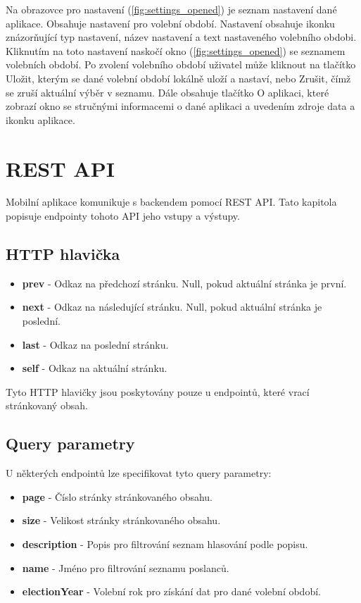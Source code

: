 Na obrazovce pro nastavení (\ref{fig:settings_opened}) je seznam nastavení dané aplikace. Obsahuje nastavení pro volební období. Nastavení obsahuje ikonku znázorňující typ nastavení, název nastavení a text nastaveného volebního obdobi. Kliknutím na toto nastavení naskočí okno (\ref{fig:settings_opened}) se seznamem volebních období. Po zvolení volebního období uživatel může kliknout na tlačítko Uložit, kterým se dané volební období lokálně uloží a nastaví, nebo Zrušit, čímž se zruší aktuální výběr v seznamu. Dále obsahuje tlačítko O aplikaci, které zobrazí okno se stručnými informacemi o dané aplikaci a uvedením zdroje data a ikonku aplikace.

\section{REST API}

Mobilní aplikace komunikuje s backendem pomocí REST API. Tato kapitola popisuje endpointy tohoto  API jeho vstupy a výstupy.

\subsection*{HTTP hlavička}

\begin{itemize}
	\item \textbf{prev} - Odkaz na předchozí stránku. Null, pokud aktuální stránka je první.
	\item \textbf{next} - Odkaz na následující stránku. Null, pokud aktuální stránka je poslední.
	\item \textbf{last} - Odkaz na poslední stránku.
	\item \textbf{self} - Odkaz na aktuální stránku.
\end{itemize}

\noindent Tyto HTTP hlavičky jsou poskytovány pouze u endpointů, které vrací stránkovaný obsah.

\subsection*{Query parametry}
U některých endpointů lze specifikovat tyto query parametry:

\begin{itemize}
	\item \textbf{page} - Číslo stránky stránkovaného obsahu.
	\item \textbf{size} - Velikost stránky stránkovaného obsahu.
	\item \textbf{description} - Popis pro filtrování seznam hlasování podle popisu.
	\item \textbf{name} - Jméno pro filtrování seznamu poslanců.
	\item \textbf{electionYear} - Volební rok pro získání dat pro dané volební období.
\end{itemize}

